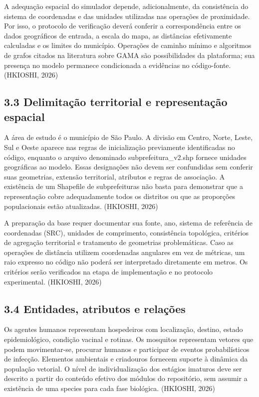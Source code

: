 A adequação espacial do simulador depende, adicionalmente, da
consistência do sistema de coordenadas e das unidades utilizadas nas
operações de proximidade. Por isso, o protocolo de verificação deverá
conferir a correspondência entre os dados geográficos de entrada, a
escala do mapa, as distâncias efetivamente calculadas e os limites do
município. Operações de caminho mínimo e algoritmos de grafos citados na
literatura sobre GAMA são possibilidades da plataforma; sua presença no
modelo permanece condicionada a evidências no código-fonte. (HKIOSHI,
2026)

\subsection{3.3 Delimitação territorial e representação
espacial}\label{delimitauxe7uxe3o-territorial-e-representauxe7uxe3o-espacial}

A área de estudo é o município de São Paulo. A divisão em Centro, Norte,
Leste, Sul e Oeste aparece nas regras de inicialização previamente
identificadas no código, enquanto o arquivo denominado
subprefeitura\_v2.shp fornece unidades geográficas ao modelo. Essas
designações não devem ser confundidas sem conferir suas geometrias,
extensão territorial, atributos e regras de associação. A existência de
um Shapefile de subprefeituras não basta para demonstrar que a
representação cobre adequadamente todos os distritos ou que as
proporções populacionais estão atualizadas. (HKIOSHI, 2026)

A preparação da base requer documentar sua fonte, ano, sistema de
referência de coordenadas (SRC), unidades de comprimento, consistência
topológica, critérios de agregação territorial e tratamento de
geometrias problemáticas. Caso as operações de distância utilizem
coordenadas angulares em vez de métricas, um raio expresso no código não
poderá ser interpretado diretamente em metros. Os critérios serão
verificados na etapa de implementação e no protocolo experimental.
(HKIOSHI, 2026)

\subsection{3.4 Entidades, atributos e
relações}\label{entidades-atributos-e-relauxe7uxf5es}

Os agentes humanos representam hospedeiros com localização, destino,
estado epidemiológico, condição vacinal e rotinas. Os mosquitos
representam vetores que podem movimentar-se, procurar humanos e
participar de eventos probabilísticos de infecção. Elementos ambientais
e criadouros fornecem suporte à dinâmica da população vetorial. O nível
de individualização dos estágios imaturos deve ser descrito a partir do
conteúdo efetivo dos módulos do repositório, sem assumir a existência de
uma species para cada fase biológica. (HKIOSHI, 2026)

